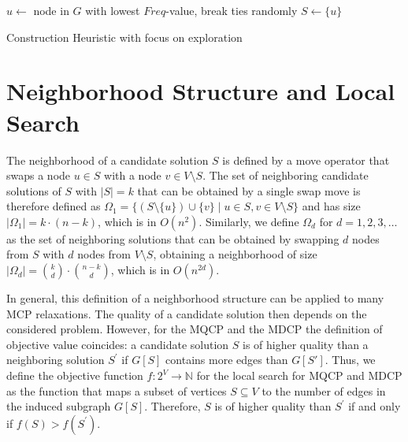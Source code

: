 \documentclass[draft,final]{vutinfth} %
\begin{document}
\begin{algorithm}
    \DontPrintSemicolon
    $u \gets $ node in $G$ with lowest $Freq$-value, break ties randomly \;
    $S \gets \{u\}$ \;
    \label{alg:exploration-construction-while-end}
    \caption{Construction Heuristic with focus on exploration}
    \label{alg:exploration-construction}
\end{algorithm}

\section{Neighborhood Structure and Local Search} \label{sec:neighborhood-structure}

The neighborhood of a candidate solution $S$ is defined by a move operator that swaps a node $u \in S$ with a node $v \in V \setminus S$. The set of neighboring candidate solutions of $S$ with $|S| = k$ that can be obtained by a single swap move is therefore defined as $\Omega_1 = \{ (S \setminus \{u\}) \cup \{v\} \mid u \in S, v \in V \setminus S \}$ and has size $|\Omega_1| = k \cdot (n-k)$, which is in $O(n^2)$. Similarly, we define $\Omega_d$ for $d=1,2,3,\dots$ as the set of neighboring solutions that can be obtained by swapping $d$ nodes from $S$ with $d$ nodes from $V \setminus S$, obtaining a neighborhood of size $|\Omega_d| = \binom{k}{d} \cdot \binom{n-k}{d}$, which is in $O(n^{2d})$. 

In general, this definition of a neighborhood structure can be applied to many MCP relaxations. The quality of a candidate solution then depends on the considered problem. However, for the MQCP and the MDCP the definition of objective value coincides: a candidate solution $S$ is of higher quality than a neighboring solution $S^\prime$ if $G[S]$ contains more edges than $G[S']$. Thus, we define the objective function $f \colon 2^V \rightarrow \mathbb{N}$ for the local search for MQCP and MDCP as the function that maps a subset of vertices $S \subseteq V$ to the number of edges in the induced subgraph $G[S]$. Therefore, $S$ is of higher quality than $S^\prime$ if and only if $f(S) > f(S^\prime)$. 
\end{document}
